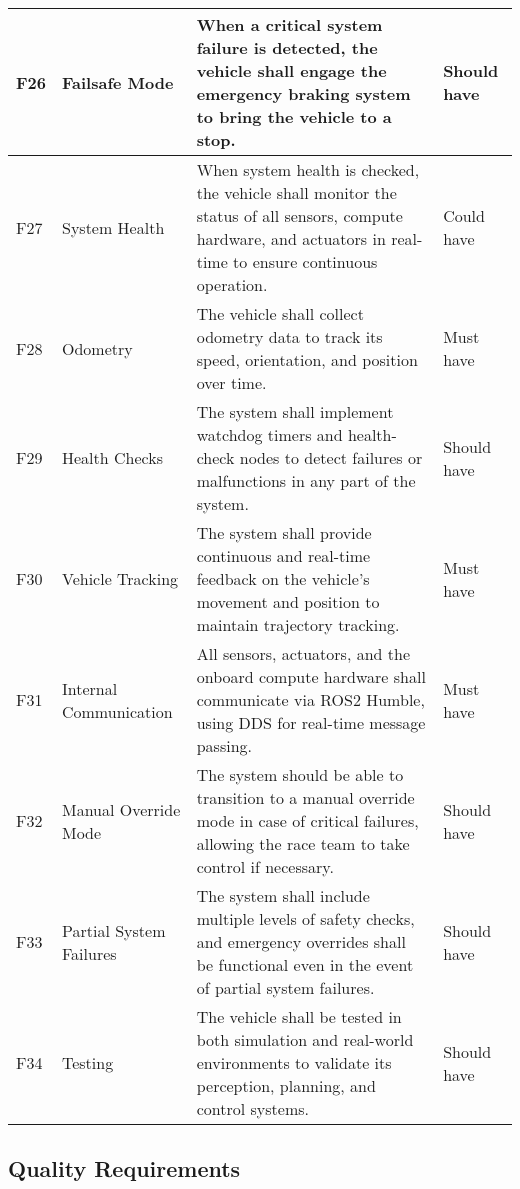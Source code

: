 \begin{center}
\begin{longtable}{ | m{2em} | m{10em} | m{16em} | m{8em} | }
		\hline
		F26 & Failsafe Mode & When a critical system failure is detected, the vehicle shall engage the emergency braking system to bring the vehicle to a stop. & Should have\\
		\hline
		F27 & System Health & When system health is checked, the vehicle shall monitor the status of all sensors, compute hardware, and actuators in real-time to ensure continuous operation. & Could have \\
		\hline
		F28 & Odometry & The vehicle shall collect odometry data to track its speed, orientation, and position over time. & Must have\\
		\hline
		F29 & Health Checks & The system shall implement watchdog timers and health-check nodes to detect failures or malfunctions in any part of the system. & Should have\\
		\hline
		F30 & Vehicle Tracking & The system shall provide continuous and real-time feedback on the vehicle's movement and position to maintain trajectory tracking. & Must have \\
		\hline
		F31 & Internal Communication & All sensors, actuators, and the onboard compute hardware shall communicate via ROS2 Humble, using DDS for real-time message passing. & Must have\\
		\hline
		F32 & Manual Override Mode & The system should be able to transition to a manual override mode in case of critical failures, allowing the race team to take control if necessary. & Should have\\
		\hline
		F33 & Partial System Failures & The system shall include multiple levels of safety checks, and emergency overrides shall be functional even in the event of partial system failures. & Should have\\
		\hline
		F34 & Testing & The vehicle shall be tested in both simulation and real-world environments to validate its perception, planning, and control systems. & Should have \\
		\hline
	\end{longtable}
\end{center}

\subsection{Quality Requirements}

